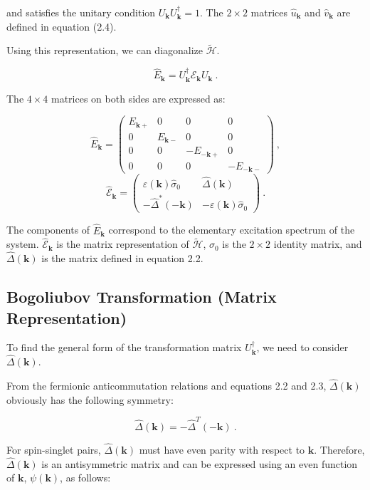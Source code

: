 \documentclass[uplatex,a4j,12pt,dvipdfmx]{jsarticle}
\begin{document}
and satisfies the unitary condition $U_{\bm{k}} U_{\bm{k}}^{\dagger} = 1$.
The $2 \times 2$ matrices $\hat{u}_{\bm{k}}$ and $\hat{v}_{\bm{k}}$ are defined in equation (2.4).

Using this representation, we can diagonalize $\tilde{\mathcal{H}}$.

\[
	\hat{E}_{\bm{k}}
	=
	U_{\bm{k}}^{\dagger}
	\hat{\mathcal{E}}_{\bm{k}}
	U_{\bm{k}}
	\ .
\]

The $4 \times 4$ matrices on both sides are expressed as:

\[
	\hat{E}_{\bm{k}}
	=
	\left(
	\begin{array}{cccc}
			E_{\bm{k} +} & 0            & 0               & 0               \\
			0            & E_{\bm{k} -} & 0               & 0               \\
			0            & 0            & - E_{-\bm{k} +} & 0               \\
			0            & 0            & 0               & - E_{-\bm{k} -}
		\end{array}
	\right)
	\ , \]\[
	\hat{\mathcal{E}}_{\bm{k}}
	=
	\left(
	\begin{array}{cc}
			\varepsilon(\bm{k}) \hat{\sigma}_{0} & \hat{\Delta}(\bm{k})                   \\[2mm]
			- \hat{\Delta}^{*}(-\bm{k})          & - \varepsilon(\bm{k}) \hat{\sigma}_{0}
		\end{array}
	\right)
	\ .
\]

The components of $\hat{E}_{\bm{k}}$ correspond to the elementary excitation spectrum of the system.
$\hat{\mathcal{E}}_{\bm{k}}$ is the matrix representation of $\tilde{\mathcal{H}}$, $\hat{\sigma}_{0}$ is the $2 \times 2$ identity matrix, and $\hat{\Delta}(\bm{k})$ is the matrix defined in equation 2.2.


\subsection{Bogoliubov Transformation (Matrix Representation)}
To find the general form of the transformation matrix $U_{\bm{k}}^{\dagger}$, we need to consider $\hat{\Delta}(\bm{k})$.

From the fermionic anticommutation relations and equations 2.2 and 2.3, $\hat{\Delta}(\bm{k})$ obviously has the following symmetry:

\[
	\hat{\Delta}(\bm{k})
	=
	- \hat{\Delta}^{T}(-\bm{k})
	\ .
\]

For spin-singlet pairs, $\hat{\Delta}(\bm{k})$ must have even parity with respect to $\bm{k}$.
Therefore, $\hat{\Delta}(\bm{k})$ is an antisymmetric matrix and can be expressed using an even function of $\bm{k}$, $\psi(\bm{k})$, as follows:
\end{document}
